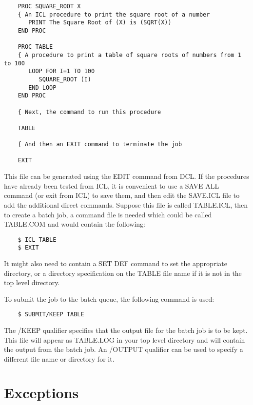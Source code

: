 \begin{small}
\begin{verbatim}
    PROC SQUARE_ROOT X
    { An ICL procedure to print the square root of a number
       PRINT The Square Root of (X) is (SQRT(X))
    END PROC

    PROC TABLE
    { A procedure to print a table of square roots of numbers from 1 to 100
       LOOP FOR I=1 TO 100
          SQUARE_ROOT (I)
       END LOOP
    END PROC

    { Next, the command to run this procedure

    TABLE

    { And then an EXIT command to terminate the job

    EXIT
\end{verbatim}
\end{small}

This file can be generated using the EDIT command from DCL.
If the procedures have already been tested from ICL, it is convenient to use
a SAVE ALL command (or exit from ICL) to save them, and then edit the SAVE.ICL
file to add the additional direct commands.
Suppose this file is called TABLE.ICL, then to create a batch job, a command
file is needed which could be called TABLE.COM and would contain the following:

\begin{small}
\begin{verbatim}
    $ ICL TABLE
    $ EXIT
\end{verbatim}
\end{small}

It might also need to contain a SET DEF command to set the appropriate
directory, or a directory specification on the TABLE file name if it is
not in the top level directory.

To submit the job to the batch queue, the following command is used:

\begin{small}
\begin{verbatim}
    $ SUBMIT/KEEP TABLE
\end{verbatim}
\end{small}

The /KEEP qualifier specifies that the output file for the batch job is
to be kept.
This file will appear as TABLE.LOG in your top level directory and will contain
the output from the batch job.
An /OUTPUT qualifier can be used to specify a different file name or directory
for it.

\section{Exceptions}
\label{S_excep}

